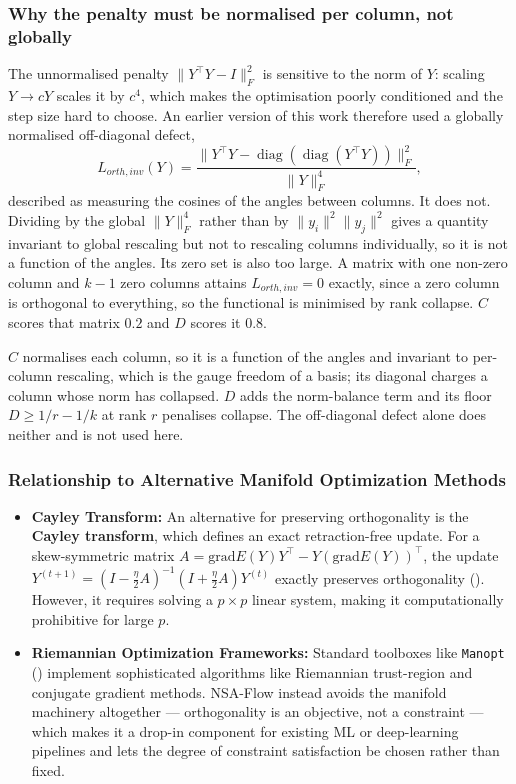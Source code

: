 \documentclass[
]{article}
\begin{document}
\subsubsection{Why the penalty must be normalised per column, not globally}\label{percolumn}

The unnormalised penalty \(\| Y^\top Y - I \|_F^2\) is sensitive to the norm of \(Y\): scaling \(Y \to cY\) scales it by \(c^4\), which makes the optimisation poorly conditioned and the step size hard to choose. An earlier version of this work therefore used a globally normalised off-diagonal defect,
\[
L_{orth, inv}(Y) = \frac{\| Y^\top Y - \operatorname{diag}(\operatorname{diag}(Y^\top Y)) \|_F^2}{\|Y\|_F^4},
\]
described as measuring the cosines of the angles between columns. It does not. Dividing by the global \(\|Y\|_F^4\) rather than by \(\|y_i\|^2\|y_j\|^2\) gives a quantity invariant to global rescaling but not to rescaling columns individually, so it is not a function of the angles. Its zero set is also too large. A matrix with one non-zero column and \(k-1\) zero columns attains \(L_{orth, inv} = 0\) exactly, since a zero column is orthogonal to everything, so the functional is minimised by rank collapse. \(C\) scores that matrix \(0.2\) and \(D\) scores it \(0.8\).

\(C\) normalises each column, so it is a function of the angles and invariant to per-column rescaling, which is the gauge freedom of a basis; its diagonal charges a column whose norm has collapsed. \(D\) adds the norm-balance term and its floor \(D \ge 1/r - 1/k\) at rank \(r\) penalises collapse. The off-diagonal defect alone does neither and is not used here.

\subsubsection{Relationship to Alternative Manifold Optimization Methods}\label{relationship-to-alternative-manifold-optimization-methods}

\begin{itemize}
\item
  \textbf{Cayley Transform:} An alternative for preserving orthogonality is the \textbf{Cayley transform}, which defines an exact retraction-free update. For a skew-symmetric matrix \(A = \text{grad}E(Y) Y^\top - Y (\text{grad}E(Y))^\top\), the update \(Y^{(t+1)} = ( I - \frac{\eta}{2} A )^{-1} ( I + \frac{\eta}{2} A ) Y^{(t)}\) exactly preserves orthogonality (). However, it requires solving a \(p \times p\) linear system, making it computationally prohibitive for large \(p\).
\item
  \textbf{Riemannian Optimization Frameworks:} Standard toolboxes like \texttt{Manopt} () implement sophisticated algorithms like Riemannian trust-region and conjugate gradient methods. NSA-Flow instead avoids the manifold machinery altogether --- orthogonality is an objective, not a constraint --- which makes it a drop-in component for existing ML or deep-learning pipelines and lets the degree of constraint satisfaction be chosen rather than fixed.
\end{itemize}
\end{document}
